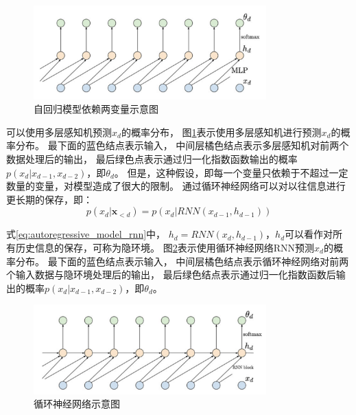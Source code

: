 \begin{figure}[ht]
    \centering
    \includegraphics[width=0.8\textwidth]{figures/autoregressive_model_finite_memory}
    \caption{自回归模型依赖两变量示意图}\label{fig:autoregressive_model_finite_memory}
\end{figure}
可以使用多层感知机预测{$x_d$}的概率分布，
图{\ref{fig:autoregressive_model_finite_memory}}表示使用多层感知机进行预测{$x_d$}的概率分布。
最下面的蓝色结点表示输入，
中间层橘色结点表示多层感知机对前两个数据处理后的输出，
最后绿色点表示通过归一化指数函数输出的概率{$p(x_d \rvert x_{d-1},x_{d-2})$}，即{$\theta_d$}。
但是，这种假设，即每一个变量只依赖于不超过一定数量的变量，对模型造成了很大的限制。
通过循环神经网络可以对以往信息进行更长期的保存{ {\cite{Jakub2022deep}}}，即：
\begin{equation}
    \label{eq:autoregressive_model_rnn}
    p(x_d \rvert \bm{x}_{<d})=p(x_d \vert RNN(x_{d-1},h_{d-1}))
\end{equation}

式{\ref{eq:autoregressive_model_rnn}}中，
{$h_d=RNN(x_d, h_{d-1})$}，{$h_d$}可以看作对所有历史信息的保存，可称为隐环境。
图{\ref{fig:autoregressive_model_rnn}}表示使用循环神经网络RNN预测{$x_d$}的概率分布。
最下面的蓝色结点表示输入，
中间层橘色结点表示循环神经网络对前两个输入数据与隐环境处理后的输出，
最后绿色结点表示通过归一化指数函数后输出的概率{$p(x_d \rvert x_{d-1},x_{d-2})$}，即{$\theta_d$}。
\begin{figure}[ht]
    \centering
    \includegraphics[width=0.8\textwidth]{figures/autoregressive_model_rnn}
    \caption{循环神经网络示意图}\label{fig:autoregressive_model_rnn}
\end{figure}

